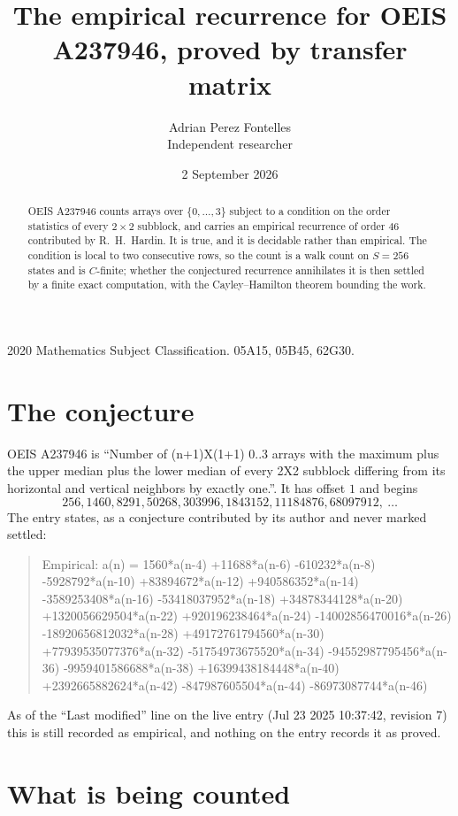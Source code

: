 \documentclass[11pt,a4paper]{article}
\title{The empirical recurrence for OEIS A237946, proved by transfer matrix}
\author{Adrian Perez Fontelles\\ \small Independent researcher}
\date{2 September 2026}
\theoremstyle{plain}
\theoremstyle{definition}
\begin{document}
\maketitle

\begin{abstract}
OEIS A237946 counts arrays over $\{0,\dots,3\}$ subject to a condition on the order
statistics of every $2\times2$ subblock, and carries an empirical recurrence of order
$46$ contributed by R.~H.~Hardin. It is true, and it is decidable rather than empirical.
The condition is local to two consecutive rows, so the count is a walk count on $S=256$
states and is $C$-finite; whether the conjectured recurrence annihilates it is then settled by
a finite exact computation, with the Cayley--Hamilton theorem bounding the work.
\end{abstract}

\noindent\small 2020 Mathematics Subject Classification. 05A15, 05B45, 62G30.\normalsize

\section{The conjecture}

OEIS A237946 is ``Number of (n+1)X(1+1) 0..3 arrays with the maximum plus the upper median plus the lower median of every 2X2 subblock differing from its horizontal and vertical neighbors by exactly one.''. It has offset $1$ and begins
\[
256, 1460, 8291, 50268, 303996, 1843152, 11184876, 68097912,\ \dots
\]
The entry states, as a conjecture contributed by its author and never marked settled:
\begin{quote}
Empirical: a(n) = 1560*a(n-4) +11688*a(n-6) -610232*a(n-8) -5928792*a(n-10) +83894672*a(n-12) +940586352*a(n-14) -3589253408*a(n-16) -53418037952*a(n-18) +34878344128*a(n-20) +1320056629504*a(n-22) +920196238464*a(n-24) -14002856470016*a(n-26) -18920656812032*a(n-28) +49172761794560*a(n-30) +77939535077376*a(n-32) -51754973675520*a(n-34) -94552987795456*a(n-36) -9959401586688*a(n-38) +16399438184448*a(n-40) +2392665882624*a(n-42) -847987605504*a(n-44) -86973087744*a(n-46)
\end{quote}
As of the ``Last modified'' line on the live entry (Jul 23 2025 10:37:42, revision 7) this is still
recorded as empirical, and nothing on the entry records it as proved.

\section{What is being counted}
\end{document}
